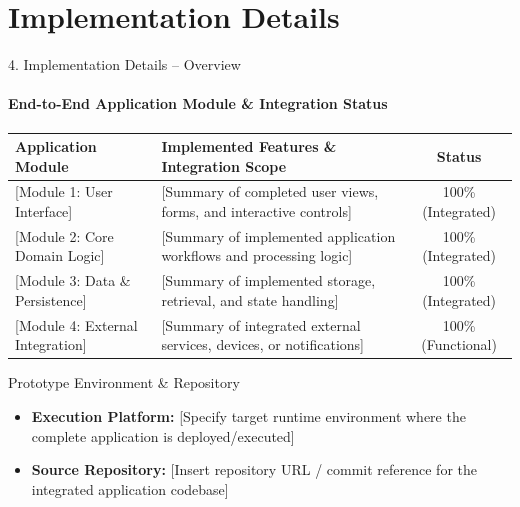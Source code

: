 \documentclass[aspectratio=169, 11pt]{beamer}
\begin{document}
\section{Implementation Details}

\begin{frame}{4. Implementation Details -- Overview}
    \framesubtitle{End-to-End Application Module \& Integration Status}
    \begin{table}
        \centering
        \footnotesize
        \renewcommand{\arraystretch}{1.25}
        \begin{tabular}{p{3.6cm} p{6.2cm} c}
            \toprule
            \textbf{Application Module} & \textbf{Implemented Features \& Integration Scope} & \textbf{Status} \\
            \midrule
            {[Module 1: User Interface]} & {[Summary of completed user views, forms, and interactive controls]} & 100\% (Integrated) \\
            {[Module 2: Core Domain Logic]} & {[Summary of implemented application workflows and processing logic]} & 100\% (Integrated) \\
            {[Module 3: Data \& Persistence]} & {[Summary of implemented storage, retrieval, and state handling]} & 100\% (Integrated) \\
            {[Module 4: External Integration]} & {[Summary of integrated external services, devices, or notifications]} & 100\% (Functional) \\
            \bottomrule
        \end{tabular}
    \end{table}

    \begin{block}{Prototype Environment \& Repository}
        \footnotesize
        \begin{itemize}
            \item \textbf{Execution Platform:} {[Specify target runtime environment where the complete application is deployed/executed]}
            \item \textbf{Source Repository:} {[Insert repository URL / commit reference for the integrated application codebase]}
        \end{itemize}
    \end{block}
\end{frame}
\end{document}
